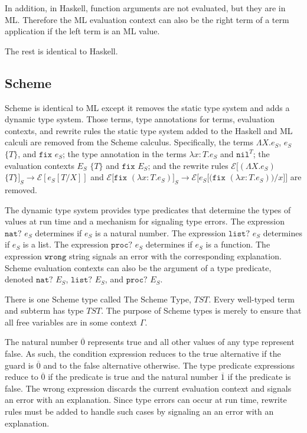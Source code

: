 In addition, in Haskell, function arguments are not evaluated, but they are in ML.  Therefore the ML evaluation context can also be the right term of a term application if the left term is an ML value.

The rest is identical to Haskell.

\subsection{Scheme}

Scheme is identical to ML except it removes the static type system and adds a dynamic type system.  Those terms, type annotations for terms, evaluation contexts, and rewrite rules the static type system added to the Haskell and ML calculi are removed from the Scheme calculus.  Specifically, the terms $\Lambda X.e_{S}$, $e_{S}$ $\lbrace T\rbrace$, and $\mathtt{fix}$ $e_{S}$; the type annotation in the terms $\lambda x:T.e_{S}$ and $\mathtt{nil}^{T}$; the evaluation contexts $E_{S}$ $\lbrace T\rbrace$ and $\mathtt{fix}$ $E_{S}$; and the rewrite rules $\mathscr{E}[(\Lambda X.e_{S})$ $\lbrace T\rbrace]_{S}\rightarrow\mathscr{E}[e_{S}[T/X]]$ and $\mathscr{E}[\mathtt{fix}$ $(\lambda x:T.e_{S})]_{S}\rightarrow\mathscr{E}[e_{S}[(\mathtt{fix}$ $(\lambda x:T.e_{S}))/x]]$ are removed.

The dynamic type system provides type predicates that determine the types of values at run time and a mechanism for signaling type errors.  The expression $\mathtt{nat?}$ $e_{S}$ determines if $e_{S}$ is a natural number.  The expression $\mathtt{list?}$ $e_{S}$ determines if $e_{S}$ is a list.  The expression $\mathtt{proc?}$ $e_{S}$ determines if $e_{S}$ is a function.  The expression $\mathtt{wrong}$ string signals an error with the corresponding explanation.  Scheme evaluation contexts can also be the argument of a type predicate, denoted $\mathtt{nat?}$ $E_{S}$, $\mathtt{list?}$ $E_{S}$, and $\mathtt{proc?}$ $E_{S}$.

There is one Scheme type called The Scheme Type, $TST$.  Every well-typed term and subterm has type $TST$.  The purpose of Scheme types is merely to ensure that all free variables are in some context $\Gamma$.

The natural number $\overline{0}$ represents true and all other values of any type represent false.  As such, the condition expression reduces to the true alternative if the guard is $\overline{0}$ and to the false alternative otherwise.  The type predicate expressions reduce to $\overline{0}$ if the predicate is true and the natural number $\overline{1}$ if the predicate is false.  The wrong expression discards the current evaluation context and signals an error with an explanation.  Since type errors can occur at run time, rewrite rules must be added to handle such cases by signaling an an error with an explanation.

